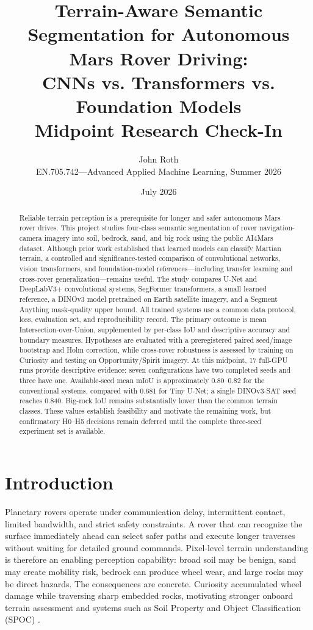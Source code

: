 \documentclass[11pt]{article}
\title{\textbf{Terrain-Aware Semantic Segmentation for Autonomous Mars Rover Driving:}\\
CNNs vs. Transformers vs. Foundation Models\\[0.5em]
\large Midpoint Research Check-In}
\author{John Roth\\
EN.705.742---Advanced Applied Machine Learning, Summer 2026}
\date{July 2026}
\newcommand{\miou}{\ensuremath{\mathrm{mIoU}}}
\begin{document}
\maketitle

\begin{abstract}
Reliable terrain perception is a prerequisite for longer and safer autonomous Mars rover drives.
This project studies four-class semantic segmentation of rover navigation-camera imagery into
soil, bedrock, sand, and big rock using the public AI4Mars dataset. Although prior work established
that learned models can classify Martian terrain, a controlled and significance-tested comparison
of convolutional networks, vision transformers, and foundation-model references---including
transfer learning and cross-rover generalization---remains useful. The study compares U-Net and
DeepLabV3+ convolutional systems, SegFormer transformers, a small learned reference, a DINOv3 model
pretrained on Earth satellite imagery, and a Segment Anything mask-quality upper bound. All trained
systems use a common data protocol, loss, evaluation set, and reproducibility record. The primary
outcome is mean Intersection-over-Union, supplemented by per-class IoU and descriptive accuracy and
boundary measures. Hypotheses are evaluated with a preregistered paired seed/image bootstrap and
Holm correction, while cross-rover robustness is assessed by training on Curiosity and testing on
Opportunity/Spirit imagery. At this midpoint, 17 full-GPU runs provide descriptive evidence:
seven configurations have two completed seeds and three have one. Available-seed mean \miou{} is
approximately 0.80--0.82 for the conventional systems, compared with 0.681 for Tiny U-Net; a
single DINOv3-SAT seed reaches 0.840. Big-rock IoU remains substantially lower than the common
terrain classes. These values establish feasibility and motivate the remaining work, but
confirmatory H0--H5 decisions remain deferred until the complete three-seed experiment set is
available.
\end{abstract}

\section{Introduction}

Planetary rovers operate under communication delay, intermittent contact, limited bandwidth, and
strict safety constraints. A rover that can recognize the surface immediately ahead can select
safer paths and execute longer traverses without waiting for detailed ground commands. Pixel-level
terrain understanding is therefore an enabling perception capability: broad soil may be benign,
sand may create mobility risk, bedrock can produce wheel wear, and large rocks may be direct
hazards. The consequences are concrete. Curiosity accumulated wheel damage while traversing sharp
embedded rocks, motivating stronger onboard terrain assessment and systems such as Soil Property
and Object Classification (SPOC) \cite{rothrock2016spoc}.
\end{document}
